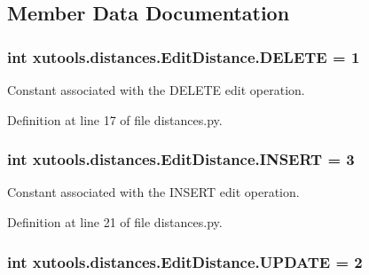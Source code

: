 \subsection{Member Data Documentation}
\hypertarget{classxutools_1_1distances_1_1_edit_distance_aaa1544e3e291d6c7d8bc51e61189dcd1}{
\subsubsection[{D\-E\-L\-E\-T\-E}]{\setlength{\rightskip}{0pt plus 5cm}int xutools.\-distances.\-Edit\-Distance.\-D\-E\-L\-E\-T\-E = 1\hspace{0.3cm}{\ttfamily [static]}}}\label{classxutools_1_1distances_1_1_edit_distance_aaa1544e3e291d6c7d8bc51e61189dcd1}


Constant associated with the D\-E\-L\-E\-T\-E edit operation. 



Definition at line 17 of file distances.\-py.

\hypertarget{classxutools_1_1distances_1_1_edit_distance_a76c00e94c810634eee296a4e298f86d2}{
\subsubsection[{I\-N\-S\-E\-R\-T}]{\setlength{\rightskip}{0pt plus 5cm}int xutools.\-distances.\-Edit\-Distance.\-I\-N\-S\-E\-R\-T = 3\hspace{0.3cm}{\ttfamily [static]}}}\label{classxutools_1_1distances_1_1_edit_distance_a76c00e94c810634eee296a4e298f86d2}


Constant associated with the I\-N\-S\-E\-R\-T edit operation. 



Definition at line 21 of file distances.\-py.

\hypertarget{classxutools_1_1distances_1_1_edit_distance_a27373ca74c5dad1c376df5087c0c7e5c}{
\subsubsection[{U\-P\-D\-A\-T\-E}]{\setlength{\rightskip}{0pt plus 5cm}int xutools.\-distances.\-Edit\-Distance.\-U\-P\-D\-A\-T\-E = 2\hspace{0.3cm}{\ttfamily [static]}}}\label{classxutools_1_1distances_1_1_edit_distance_a27373ca74c5dad1c376df5087c0c7e5c}


